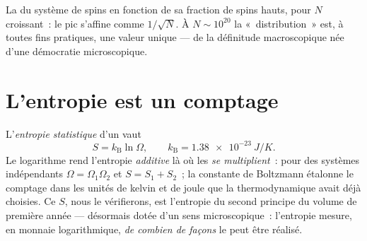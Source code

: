 \begin{omfigure}

{\small La  du système de spins en fonction de sa fraction
de spins hauts, pour $N$ croissant~: le pic s'affine comme
$1/\sqrt N$. À $N \sim
10^{20}$ la «~distribution~» est, à toutes fins pratiques, une valeur
unique --- de la définitude macroscopique née d'une démocratie
microscopique.}
\end{omfigure}

\section{L'entropie est un comptage}

\begin{definition}\label{def:b3:microcanonical-ensemble:entropy}
L'\emph{entropie statistique} d'un  vaut
\[
S = k_{\text{B}}\ln\Omega , \qquad
k_{\text{B}} = \qty{1.38e-23}{J/K} .
\]
Le logarithme rend l'entropie \emph{additive} là où les 
\emph{se multiplient}~: pour des systèmes indépendants
$\Omega = \Omega_1\Omega_2$ et $S = S_1 + S_2$~; la constante de
Boltzmann étalonne le comptage dans les unités de kelvin et de joule
que la thermodynamique avait déjà choisies. Ce $S$, nous le
vérifierons, est l'entropie du second principe du volume de première
année --- désormais dotée d'un sens microscopique~: l'entropie mesure,
en monnaie logarithmique, \emph{de combien de façons} le 
peut être réalisé.
\end{definition}

